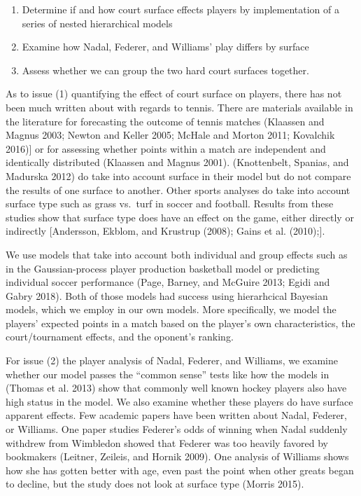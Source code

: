 \documentclass[]{article}
\begin{document}
\begin{enumerate}
\def\labelenumi{\arabic{enumi}.}
\item
  Determine if and how court surface effects players by implementation
  of a series of nested hierarchical models
\item
  Examine how Nadal, Federer, and Williams' play differs by surface
\item
  Assess whether we can group the two hard court surfaces together.
\end{enumerate}

As to issue (1) quantifying the effect of court surface on players,
there has not been much written about with regards to tennis. There are
materials available in the literature for forecasting the outcome of
tennis matches (Klaassen and Magnus 2003; Newton and Keller 2005; McHale
and Morton 2011; Kovalchik 2016){]} or for assessing whether points
within a match are independent and identically distributed (Klaassen and
Magnus 2001). (Knottenbelt, Spanias, and Madurska 2012) do take into
account surface in their model but do not compare the results of one
surface to another. Other sports analyses do take into account surface
type such as grass vs.~turf in soccer and football. Results from these
studies show that surface type does have an effect on the game, either
directly or indirectly {[}Andersson, Ekblom, and Krustrup (2008); Gains
et al. (2010);{]}.

We use models that take into account both individual and group effects
such as in the Gaussian-process player production basketball model or
predicting individual soccer performance (Page, Barney, and McGuire
2013; Egidi and Gabry 2018). Both of those models had success using
hierarhcical Bayesian models, which we employ in our own models. More
specifically, we model the players' expected points in a match based on
the player's own characteristics, the court/tournament effects, and the
oponent's ranking.

For issue (2) the player analysis of Nadal, Federer, and Williams, we
examine whether our model passes the ``common sense'' tests like how the
models in (Thomas et al. 2013) show that commonly well known hockey
players also have high status in the model. We also examine whether
these players do have surface apparent effects. Few academic papers have
been written about Nadal, Federer, or Williams. One paper studies
Federer's odds of winning when Nadal suddenly withdrew from Wimbledon
showed that Federer was too heavily favored by bookmakers (Leitner,
Zeileis, and Hornik 2009). One analysis of Williams shows how she has
gotten better with age, even past the point when other greats began to
decline, but the study does not look at surface type (Morris 2015).
\end{document}
